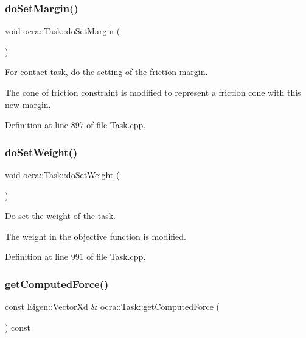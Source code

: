 \hypertarget{classocra_1_1Task_a3c7c2460b3e60764349fe5ad331e41d6}{}\label{classocra_1_1Task_a3c7c2460b3e60764349fe5ad331e41d6} 
\subsubsection{\texorpdfstring{do\+Set\+Margin()}{doSetMargin()}}
{\footnotesize\ttfamily void ocra\+::\+Task\+::do\+Set\+Margin (\begin{DoxyParamCaption}{ }\end{DoxyParamCaption})\hspace{0.3cm}{\ttfamily [protected]}}

For contact task, do the setting of the friction margin.

The cone of friction constraint is modified to represent a friction cone with this new margin. 

Definition at line 897 of file Task.\+cpp.

\hypertarget{classocra_1_1Task_a9a2c1a965f429ec5a3a756e8a1aeff37}{}\label{classocra_1_1Task_a9a2c1a965f429ec5a3a756e8a1aeff37} 
\subsubsection{\texorpdfstring{do\+Set\+Weight()}{doSetWeight()}}
{\footnotesize\ttfamily void ocra\+::\+Task\+::do\+Set\+Weight (\begin{DoxyParamCaption}{ }\end{DoxyParamCaption})\hspace{0.3cm}{\ttfamily [protected]}}

Do set the weight of the task.

The weight in the objective function is modified. 

Definition at line 991 of file Task.\+cpp.

\hypertarget{classocra_1_1Task_af41c0c9d72e1b9511567b06febe11a62}{}\label{classocra_1_1Task_af41c0c9d72e1b9511567b06febe11a62} 
\subsubsection{\texorpdfstring{get\+Computed\+Force()}{getComputedForce()}}
{\footnotesize\ttfamily const Eigen\+::\+Vector\+Xd \& ocra\+::\+Task\+::get\+Computed\+Force (\begin{DoxyParamCaption}{ }\end{DoxyParamCaption}) const}



